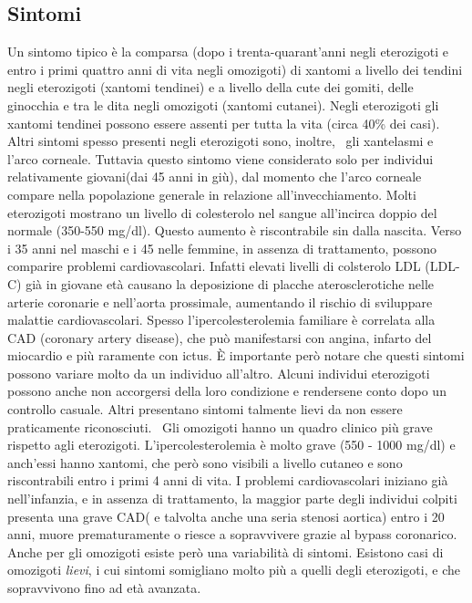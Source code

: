 \documentclass[a4paper, 12pt]{article}
\begin{document}
\begin{titlepage}
\subsection{Sintomi}
Un sintomo tipico è la comparsa (dopo i trenta-quarant’anni negli eterozigoti e entro i primi quattro anni di vita negli omozigoti) di xantomi a livello dei tendini negli eterozigoti (xantomi tendinei) e a livello della cute dei gomiti, delle ginocchia e tra le dita negli omozigoti (xantomi cutanei). Negli eterozigoti gli xantomi tendinei possono essere assenti per tutta la vita (circa 40\% dei casi). Altri sintomi spesso presenti negli eterozigoti sono, inoltre,  gli xantelasmi e l’arco corneale. Tuttavia questo sintomo viene considerato solo per individui relativamente giovani(dai 45 anni in giù), dal momento che l’arco corneale compare nella popolazione generale in relazione all’invecchiamento.
Molti eterozigoti mostrano un livello di colesterolo nel sangue all’incirca doppio del normale (350-550 mg/dl). Questo aumento è riscontrabile sin dalla nascita. Verso i 35 anni nel maschi e i 45 nelle femmine, in assenza di trattamento, possono comparire problemi cardiovascolari. Infatti elevati livelli di colsterolo LDL (LDL-C) già in giovane età causano la deposizione di placche aterosclerotiche nelle arterie coronarie e nell’aorta prossimale, aumentando il rischio di sviluppare malattie cardiovascolari. Spesso l’ipercolesterolemia familiare è correlata alla CAD (coronary artery disease), che può manifestarsi con angina, infarto del miocardio e più raramente con ictus. È importante però notare che questi sintomi possono variare molto da un individuo all’altro. Alcuni individui eterozigoti possono anche non accorgersi della loro condizione e rendersene conto dopo un controllo casuale. Altri presentano sintomi talmente lievi da non essere praticamente riconosciuti.  Gli omozigoti hanno un quadro clinico più grave rispetto agli eterozigoti. L’ipercolesterolemia è molto grave (550 - 1000 mg/dl) e anch’essi hanno xantomi, che però sono visibili a livello cutaneo e sono riscontrabili entro i primi 4 anni di vita. I problemi cardiovascolari iniziano già nell’infanzia, e in assenza di trattamento, la maggior parte degli individui colpiti presenta una grave CAD( e talvolta anche una seria stenosi aortica) entro i 20 anni, muore prematuramente o riesce a sopravvivere grazie al bypass coronarico. Anche per gli omozigoti esiste però una variabilità di sintomi. Esistono casi di omozigoti \textit{lievi}, i cui sintomi somigliano molto più a quelli degli eterozigoti, e che sopravvivono fino ad età avanzata.


\end{titlepage}
\end{document}
